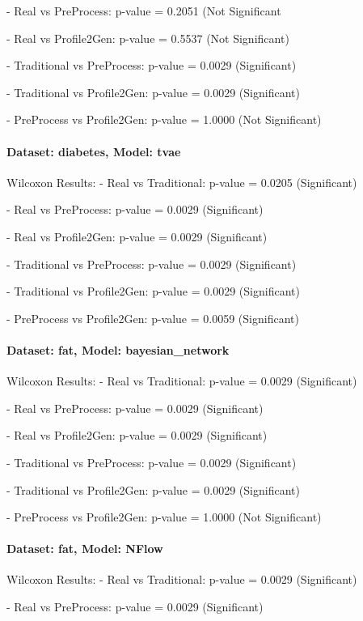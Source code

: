 \documentclass{article}
\theoremstyle{plain}
\theoremstyle{definition}
\theoremstyle{remark}
\begin{document}
- Real vs PreProcess: p-value = 0.2051 (Not Significant


- Real vs Profile2Gen: p-value = 0.5537 (Not Significant)


- Traditional vs PreProcess: p-value = 0.0029 (Significant)


- Traditional vs Profile2Gen: p-value = 0.0029 (Significant)


- PreProcess vs Profile2Gen: p-value = 1.0000 (Not Significant)



\paragraph{Dataset: diabetes, Model: tvae}
Wilcoxon Results:
- Real vs Traditional: p-value = 0.0205 (Significant)


- Real vs PreProcess: p-value = 0.0029 (Significant)


- Real vs Profile2Gen: p-value = 0.0029 (Significant)


- Traditional vs PreProcess: p-value = 0.0029 (Significant)


- Traditional vs Profile2Gen: p-value = 0.0029 (Significant)


- PreProcess vs Profile2Gen: p-value = 0.0059 (Significant)



\paragraph{Dataset: fat, Model: bayesian\_network}
Wilcoxon Results:
- Real vs Traditional: p-value = 0.0029 (Significant)


- Real vs PreProcess: p-value = 0.0029 (Significant)


- Real vs Profile2Gen: p-value = 0.0029 (Significant)


- Traditional vs PreProcess: p-value = 0.0029 (Significant)


- Traditional vs Profile2Gen: p-value = 0.0029 (Significant)


- PreProcess vs Profile2Gen: p-value = 1.0000 (Not Significant)



\paragraph{Dataset: fat, Model: NFlow}
Wilcoxon Results:
- Real vs Traditional: p-value = 0.0029 (Significant)


- Real vs PreProcess: p-value = 0.0029 (Significant)
\end{document}
